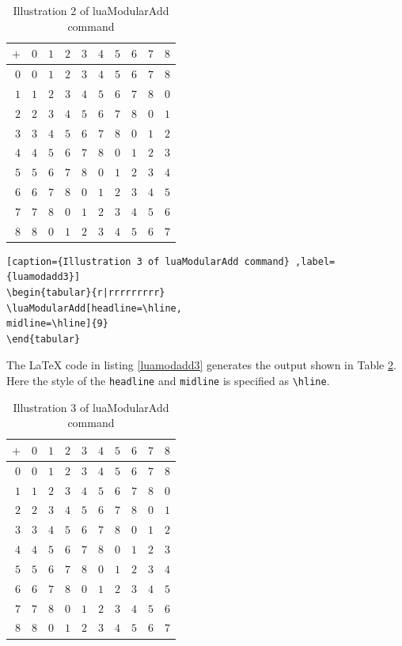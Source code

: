 ﻿\documentclass{article}
\begin{document}
\begin{table}[H]
\centering
\begin{tabular}{r|rrrrrrrrr}
$+$ & $0$ & $1$ & $2$ & $3$ & $4$ & $5$ & $6$ & $7$ & $8$\\ \hline $0$ & $0$ & $1$ & $2$ & $3$ & $4$ & $5$ & $6$ & $7$ & $8$\\ $1$ & $1$ & $2$ & $3$ & $4$ & $5$ & $6$ & $7$ & $8$ & $0$\\ $2$ & $2$ & $3$ & $4$ & $5$ & $6$ & $7$ & $8$ & $0$ & $1$\\ $3$ & $3$ & $4$ & $5$ & $6$ & $7$ & $8$ & $0$ & $1$ & $2$\\ $4$ & $4$ & $5$ & $6$ & $7$ & $8$ & $0$ & $1$ & $2$ & $3$\\ $5$ & $5$ & $6$ & $7$ & $8$ & $0$ & $1$ & $2$ & $3$ & $4$\\ $6$ & $6$ & $7$ & $8$ & $0$ & $1$ & $2$ & $3$ & $4$ & $5$\\ $7$ & $7$ & $8$ & $0$ & $1$ & $2$ & $3$ & $4$ & $5$ & $6$\\ $8$ & $8$ & $0$ & $1$ & $2$ & $3$ & $4$ & $5$ & $6$ & $7$
\end{tabular}
\caption{Illustration 2 of luaModularAdd command}
\label{luamodadd2tbl}
\end{table}

\begin{lstlisting}[caption={Illustration 3 of luaModularAdd command} ,label={luamodadd3}]
\begin{tabular}{r|rrrrrrrrr}
\luaModularAdd[headline=\hline,
midline=\hline]{9}
\end{tabular}
\end{lstlisting}
The LaTeX code in listing \ref{luamodadd3} generates the output shown in Table  \ref{luamodadd3tbl}. Here the style of the \verb|headline| and \verb|midline| is specified as \verb|\hline|.

\begin{table}[H]
\centering
\begin{tabular}{r|rrrrrrrrr}
$+$ & $0$ & $1$ & $2$ & $3$ & $4$ & $5$ & $6$ & $7$ & $8$\\ \hline $0$ & $0$ & $1$ & $2$ & $3$ & $4$ & $5$ & $6$ & $7$ & $8$\\ \hline $1$ & $1$ & $2$ & $3$ & $4$ & $5$ & $6$ & $7$ & $8$ & $0$\\ \hline $2$ & $2$ & $3$ & $4$ & $5$ & $6$ & $7$ & $8$ & $0$ & $1$\\ \hline $3$ & $3$ & $4$ & $5$ & $6$ & $7$ & $8$ & $0$ & $1$ & $2$\\ \hline $4$ & $4$ & $5$ & $6$ & $7$ & $8$ & $0$ & $1$ & $2$ & $3$\\ \hline $5$ & $5$ & $6$ & $7$ & $8$ & $0$ & $1$ & $2$ & $3$ & $4$\\ \hline $6$ & $6$ & $7$ & $8$ & $0$ & $1$ & $2$ & $3$ & $4$ & $5$\\ \hline $7$ & $7$ & $8$ & $0$ & $1$ & $2$ & $3$ & $4$ & $5$ & $6$\\ \hline $8$ & $8$ & $0$ & $1$ & $2$ & $3$ & $4$ & $5$ & $6$ & $7$
\end{tabular}
\caption{Illustration 3 of luaModularAdd command}
\label{luamodadd3tbl}
\end{table}
\end{document}
